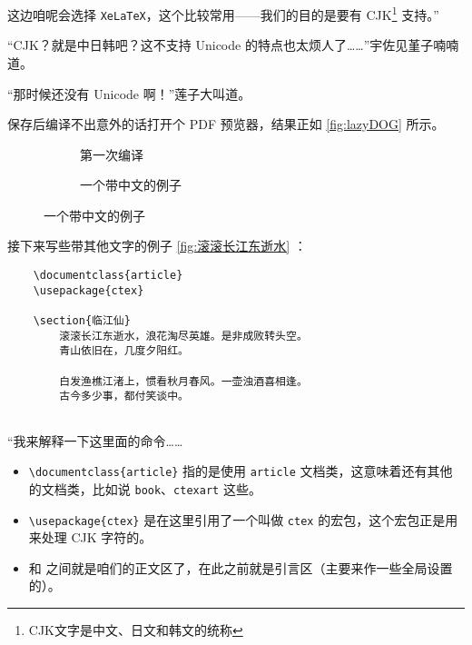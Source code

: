 这边咱呢会选择 \verb`XeLaTeX`，这个比较常用——我们的目的是要有 CJK\footnote{CJK文字是中文、日文和韩文的统称} 支持。”

“CJK？就是中日韩吧？这不支持 Unicode 的特点也太烦人了……”宇佐见堇子喃喃道。

“那时候还没有 Unicode 啊！”莲子大叫道。

保存后编译不出意外的话打开个 PDF 预览器，结果正如 \autoref{fig:lazyDOG} 所示。

\begin{figure}[t]
    \centering
    \begin{subfigure}[t]{0.4\textwidth} \centering
        \caption{第一次编译}
        \label{fig:lazyDOG}
    \end{subfigure}\quad
    \begin{subfigure}[t]{0.4\textwidth} \centering
        \caption{一个带中文的例子}
        \label{fig:滚滚长江东逝水}
    \end{subfigure}
\end{figure}

接下来写些带其他文字的例子 \autoref{fig:滚滚长江东逝水} ：

\begin{codeing}
    \begin{lstlisting}
    \documentclass{article}
    \usepackage{ctex}
    
    \section{临江仙}
        滚滚长江东逝水，浪花淘尽英雄。是非成败转头空。
        青山依旧在，几度夕阳红。

        白发渔樵江渚上，惯看秋月春风。一壶浊酒喜相逢。
        古今多少事，都付笑谈中。    
    
\end{lstlisting}
\end{codeing}

“我来解释一下这里面的命令……

\begin{itemize}
    \item \verb"\documentclass{article}" 指的是使用 \verb"article" 文档类，这意味着还有其他的文档类，比如说 \verb"book"、\verb"ctexart" 这些。
    \item \verb"\usepackage{ctex}" 是在这里引用了一个叫做 \verb"ctex" 的宏包，这个宏包正是用来处理 CJK 字符的。
    \item \verb"" 和 \verb"" 之间就是咱们的正文区了，在此之前就是引言区（主要来作一些全局设置的）。
\end{itemize}

